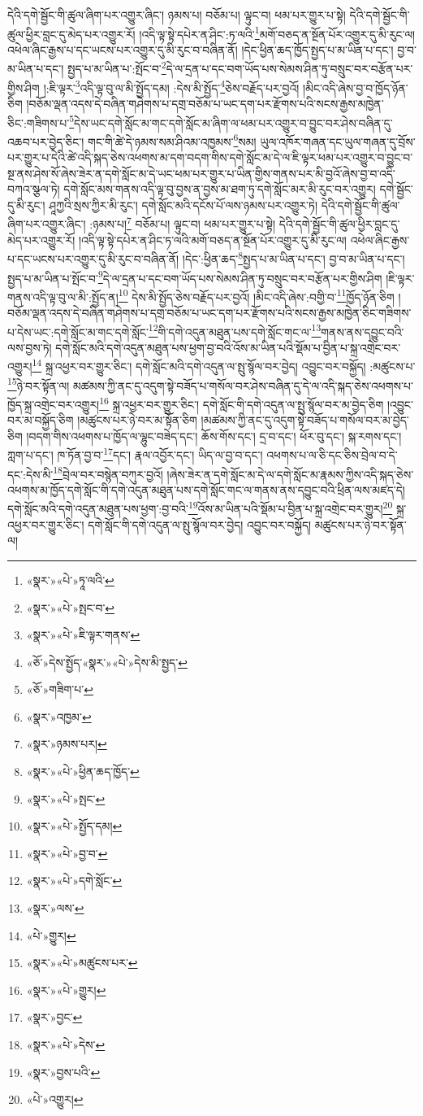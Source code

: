 དེའི་དགེ་སྦྱོང་གི་ཚུལ་ཞིག་པར་འགྱུར་ཞིང་། ཉམས་པ། བཅོམ་པ། ལྟུང་བ། ཕམ་པར་གྱུར་པ་སྟེ། དེའི་དགེ་སྦྱོང་གི་ཚུལ་ཕྱིར་བླང་དུ་མེད་པར་འགྱུར་རོ། །འདི་ལྟ་སྟེ་དཔེར་ན་ཤིང་:ཏ་ལའི་\footnote{«སྣར་»«པེ་»ཏཱ་ལའི་}མགོ་བཅད་ན་སྔོན་པོར་འགྱུར་དུ་མི་རུང་ལ། འཕེལ་ཞིང་རྒྱས་པ་དང་ཡངས་པར་འགྱུར་དུ་མི་རུང་བ་བཞིན་ནོ། །དེང་ཕྱིན་ཆད་ཁྱོད་སྤྱད་པ་མ་ཡིན་པ་དང་། བྱ་བ་མ་ཡིན་པ་དང་། སྤྱད་པ་མ་ཡིན་པ་:སྤོང་བ་\footnote{«སྣར་»«པེ་»སྤང་བ་}དེ་ལ་དྲན་པ་དང་བག་ཡོད་པས་སེམས་ཤིན་ཏུ་བསྲུང་བར་བརྩོན་པར་གྱིས་ཤིག །:ཇི་ལྟར་\footnote{«སྣར་»«པེ་»ཇི་ལྟར་གནས་}འདི་ལྟ་བུ་ལ་མི་སྤྱོད་དམ། :དེས་མི་སྤྱོད་\footnote{«ཅོ་»དེས་སྤྱོད་«སྣར་»«པེ་»དེས་མི་སྤྱད་}ཅེས་བརྗོད་པར་བྱའོ། །མིང་འདི་ཞེས་བྱ་བ་ཁྱོད་ཉོན་ཅིག །བཅོམ་ལྡན་འདས་དེ་བཞིན་གཤེགས་པ་དགྲ་བཅོམ་པ་ཡང་དག་པར་རྫོགས་པའི་སངས་རྒྱས་མཁྱེན་ཅིང་:གཟིགས་པ་\footnote{«ཅོ་»གཟིག་པ་}དེས་ཡང་དགེ་སློང་མ་གང་དགེ་སློང་མ་ཞིག་ལ་ཕམ་པར་འགྱུར་བ་བྱུང་བར་ཤེས་བཞིན་དུ་འཆབ་པར་བྱེད་ཅིང་། གང་གི་ཚེ་དེ་ཉམས་སམ་ཤིའམ་འཁྱམས་\footnote{«སྣར་»འཁྱམ་}སམ། ཡུལ་འཁོར་གཞན་དང་ཡུལ་གཞན་དུ་བྲོས་པར་གྱུར་པ་དེའི་ཚེ་འདི་སྐད་ཅེས་འཕགས་མ་དག་བདག་གིས་དགེ་སློང་མ་དེ་ལ་ཇི་ལྟར་ཕམ་པར་འགྱུར་བ་བྱུང་བ་སྔ་ནས་ཤེས་སོ་ཞེས་ཟེར་ན་དགེ་སློང་མ་དེ་ཡང་ཕམ་པར་གྱུར་པ་ཡིན་གྱིས་གནས་པར་མི་བྱའོ་ཞེས་བྱ་བ་འདི་བཀའ་སྩལ་ཏེ། དགེ་སློང་མས་གནས་འདི་ལྟ་བུ་བྱས་ན་བྱས་མ་ཐག་ཏུ་དགེ་སློང་མར་མི་རུང་བར་འགྱུར། དགེ་སྦྱོང་དུ་མི་རུང་། ཤཱཀྱའི་སྲས་ཀྱིར་མི་རུང་། དགེ་སློང་མའི་དངོས་པོ་ལས་ཉམས་པར་འགྱུར་ཏེ། དེའི་དགེ་སྦྱོང་གི་ཚུལ་ཞིག་པར་འགྱུར་ཞིང་། :ཉམས་པ།\footnote{«སྣར་»ཉམས་པར།} བཅོམ་པ། ལྟུང་བ། ཕམ་པར་གྱུར་པ་སྟེ། དེའི་དགེ་སྦྱོང་གི་ཚུལ་ཕྱིར་བླང་དུ་མེད་པར་འགྱུར་རོ། །འདི་ལྟ་སྟེ་དཔེར་ན་ཤིང་ཏ་ལའི་མགོ་བཅད་ན་སྔོན་པོར་འགྱུར་དུ་མི་རུང་ལ། འཕེལ་ཞིང་རྒྱས་པ་དང་ཡངས་པར་འགྱུར་དུ་མི་རུང་བ་བཞིན་ནོ། །དེང་:ཕྱིན་ཆད་\footnote{«སྣར་»«པེ་»ཕྱིན་ཆད་ཁྱོད་}སྤྱད་པ་མ་ཡིན་པ་དང་། བྱ་བ་མ་ཡིན་པ་དང་། སྤྱད་པ་མ་ཡིན་པ་སྤོང་བ་\footnote{«སྣར་»«པེ་»སྤང་}དེ་ལ་དྲན་པ་དང་བག་ཡོད་པས་སེམས་ཤིན་ཏུ་བསྲུང་བར་བརྩོན་པར་གྱིས་ཤིག །ཇི་ལྟར་གནས་འདི་ལྟ་བུ་ལ་མི་:སྤྱོད་ན།\footnote{«སྣར་»«པེ་»སྤྱོད་དམ།} དེས་མི་སྤྱོད་ཅེས་བརྗོད་པར་བྱའོ། །མིང་འདི་ཞེས་:བགྱི་བ་\footnote{«སྣར་»«པེ་»བྱ་བ་}ཁྱོད་ཉོན་ཅིག །བཅོམ་ལྡན་འདས་དེ་བཞིན་གཤེགས་པ་དགྲ་བཅོམ་པ་ཡང་དག་པར་རྫོགས་པའི་སངས་རྒྱས་མཁྱེན་ཅིང་གཟིགས་པ་དེས་ཡང་:དགེ་སློང་མ་གང་དགེ་སློང་\footnote{«སྣར་»«པེ་»དགེ་སློང་}གི་དགེ་འདུན་མཐུན་པས་དགེ་སློང་གང་ལ་\footnote{«སྣར་»ལས་}གནས་ནས་དབྱུང་བའི་ལས་བྱས་ཏེ། དགེ་སློང་མའི་དགེ་འདུན་མཐུན་པས་ཕྱག་བྱ་བའི་འོས་མ་ཡིན་པའི་སྡོམ་པ་བྱིན་པ་སྐྲ་འགྲེང་བར་འགྱུར།\footnote{«པེ་»གྱུར།} སྐྲ་འཕྱར་བར་གྱུར་ཅིང་། དགེ་སློང་མའི་དགེ་འདུན་ལ་སྤུ་སྙོལ་བར་བྱེད། འབྱུང་བར་བསྐྱོད། :མཚུངས་པ་\footnote{«སྣར་»«པེ་»མཚུངས་པར་}ཉེ་བར་སྟོན་ལ། མཚམས་ཀྱི་ནང་དུ་འདུག་སྟེ་བཟོད་པ་གསོལ་བར་ཤེས་བཞིན་དུ་དེ་ལ་འདི་སྐད་ཅེས་འཕགས་པ་ཁྱོད་སྐྲ་འགྲེང་བར་འགྱུར།\footnote{«སྣར་»«པེ་»གྱུར།} སྐྲ་འཕྱར་བར་གྱུར་ཅིང་། དགེ་སློང་གི་དགེ་འདུན་ལ་སྤུ་སྙོལ་བར་མ་བྱེད་ཅིག །འབྱུང་བར་མ་བསྐྱོད་ཅིག །མཚུངས་པར་ཉེ་བར་མ་སྟོན་ཅིག །མཚམས་ཀྱི་ནང་དུ་འདུག་སྟེ་བཟོད་པ་གསོལ་བར་མ་བྱེད་ཅིག །བདག་གིས་འཕགས་པ་ཁྱོད་ལ་ལྷུང་བཟེད་དང་། ཆོས་གོས་དང་། དྲ་བ་དང་། ཕོར་བུ་དང་། སྐ་རགས་དང་། ཀླག་པ་དང་། ཁ་ཏོན་བྱ་བ་\footnote{«སྣར་»བྱང་}དང་། རྣལ་འབྱོར་དང་། ཡིད་ལ་བྱ་བ་དང་། འཕགས་པ་ལ་ཅི་དང་ཅིས་བྲེལ་བ་དེ་དང་:དེས་མི་\footnote{«སྣར་»«པེ་»དེས་}བྲེལ་བར་བསྙེན་བཀུར་བྱའོ། །ཞེས་ཟེར་ན་དགེ་སློང་མ་དེ་ལ་དགེ་སློང་མ་རྣམས་ཀྱིས་འདི་སྐད་ཅེས་འཕགས་མ་ཁྱོད་དགེ་སློང་གི་དགེ་འདུན་མཐུན་པས་དགེ་སློང་གང་ལ་གནས་ནས་དབྱུང་བའི་ཕྲིན་ལས་མཛད་དེ། དགེ་སློང་མའི་དགེ་འདུན་མཐུན་པས་ཕྱག་:བྱ་བའི་\footnote{«སྣར་»བྱས་པའི་}འོས་མ་ཡིན་པའི་སྡོམ་པ་བྱིན་པ་སྐྲ་འགྲེང་བར་གྱུར།\footnote{«པེ་»འགྱུར།} སྐྲ་འཕྱར་བར་གྱུར་ཅིང་། དགེ་སློང་གི་དགེ་འདུན་ལ་སྤུ་སྙོལ་བར་བྱེད། འབྱུང་བར་བསྐྱོད། མཚུངས་པར་ཉེ་བར་སྟོན་ལ། 